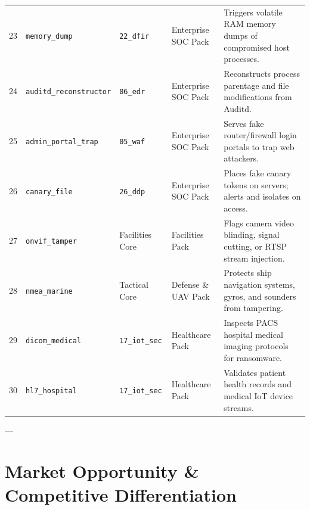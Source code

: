 \documentclass[11pt,a4paper]{article}
\begin{document}
\begin{footnotesize}
\begin{longtable}{@{}p{} p{} p{} p{} p{}@{}}
23 & \texttt{memory\_dump} & \texttt{22\_dfir} & Enterprise SOC Pack & Triggers volatile RAM memory dumps of compromised host processes. \\
24 & \texttt{auditd\_reconstructor} & \texttt{06\_edr} & Enterprise SOC Pack & Reconstructs process parentage and file modifications from Auditd. \\
25 & \texttt{admin\_portal\_trap} & \texttt{05\_waf} & Enterprise SOC Pack & Serves fake router/firewall login portals to trap web attackers. \\
26 & \texttt{canary\_file} & \texttt{26\_ddp} & Enterprise SOC Pack & Places fake canary tokens on servers; alerts and isolates on access. \\
27 & \texttt{onvif\_tamper} & Facilities Core & Facilities Pack & Flags camera video blinding, signal cutting, or RTSP stream injection. \\
28 & \texttt{nmea\_marine} & Tactical Core & Defense \& UAV Pack & Protects ship navigation systems, gyros, and sounders from tampering. \\
29 & \texttt{dicom\_medical} & \texttt{17\_iot\_sec} & Healthcare Pack & Inspects PACS hospital medical imaging protocols for ransomware. \\
30 & \texttt{hl7\_hospital} & \texttt{17\_iot\_sec} & Healthcare Pack & Validates patient health records and medical IoT device streams. \\ \bottomrule
\end{longtable}
\end{footnotesize}

---

\section{Market Opportunity \& Competitive Differentiation}
\end{document}
